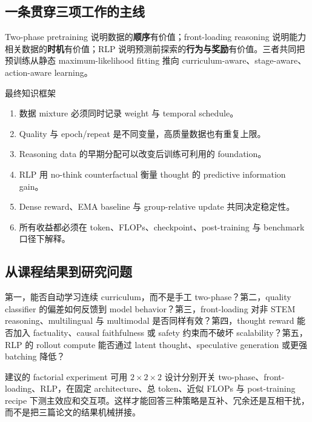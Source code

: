 \documentclass[a4paper]{article}
\begin{document}
\subsection{一条贯穿三项工作的主线}

Two-phase pretraining 说明数据的\textbf{顺序}有价值；front-loading reasoning 说明能力相关数据的\textbf{时机}有价值；RLP 说明预测前探索的\textbf{行为与奖励}有价值。三者共同把预训练从静态 maximum-likelihood fitting 推向 curriculum-aware、stage-aware、action-aware learning。

\begin{importantbox}{最终知识框架}
\begin{enumerate}
  \item 数据 mixture 必须同时记录 weight 与 temporal schedule。
  \item Quality 与 epoch/repeat 是不同变量，高质量数据也有重复上限。
  \item Reasoning data 的早期分配可以改变后训练可利用的 foundation。
  \item RLP 用 no-think counterfactual 衡量 thought 的 predictive information gain。
  \item Dense reward、EMA baseline 与 group-relative update 共同决定稳定性。
  \item 所有收益都必须在 token、FLOPs、checkpoint、post-training 与 benchmark 口径下解释。
\end{enumerate}
\end{importantbox}

\subsection{从课程结果到研究问题}

第一，能否自动学习连续 curriculum，而不是手工 two-phase？第二，quality classifier 的偏差如何反馈到 model behavior？第三，front-loading 对非 STEM reasoning、multilingual 与 multimodal 是否同样有效？第四，thought reward 能否加入 factuality、causal faithfulness 或 safety 约束而不破坏 scalability？第五，RLP 的 rollout compute 能否通过 latent thought、speculative generation 或更强 batching 降低？

\begin{knowledgebox}{建议的 factorial experiment}
可用 $2\times2\times2$ 设计分别开关 two-phase、front-loading、RLP，在固定 architecture、总 token、近似 FLOPs 与 post-training recipe 下测主效应和交互项。这样才能回答三种策略是互补、冗余还是互相干扰，而不是把三篇论文的结果机械拼接。
\end{knowledgebox}
\end{document}
